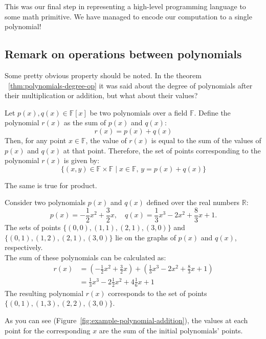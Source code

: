 \documentclass[../lecture-notes.tex]{subfiles}
\begin{document}
This was our final step in representing a high-level programming language to some math primitive.
We have managed to encode our computation to a single polynomial!

\subsection*{Remark on operations between polynomials}

\begin{remark}
    Some pretty obvious property should be noted. In the theorem ~\ref{thm:polynomials-degree-op}
    it was said about the degree of polynomials after their multiplication or addition, but what
    about their values?

    Let $p(x), q(x) \in \mathbb{F}[x]$ be two polynomials over a field $\mathbb{F}$. Define the 
    polynomial $r(x)$ as the sum of $p(x)$ and $q(x)$:
    \begin{equation*}
        r(x) = p(x) + q(x)
    \end{equation*}
    Then, for any point $x \in \mathbb{F}$, the value of $r(x)$ is equal to the sum of the
    values of $p(x)$ and $q(x)$ at that point. Therefore, the set of points corresponding to the 
    polynomial $r(x)$ is given by:
    \begin{equation*}
        \{(x, y) \in \mathbb{F} \times \mathbb{F} \mid x \in \mathbb{F}, \, y = p(x) + q(x) \}
    \end{equation*}

    The same is true for product.
\end{remark}

\begin{example}
    Consider two polynomials $p(x)$ and $q(x)$ defined over the real numbers $\mathbb{R}$:
    \begin{equation*}
        p(x) = -\frac{1}{2}x^2 + \frac{3}{2}x, \quad
        q(x) = \frac{1}{3}x^3 - 2x^2 + \frac{8}{3}x + 1.
    \end{equation*}
    The sets of points $\{(0, 0), (1, 1), (2, 1), (3, 0)\}$ and $\{(0, 1), (1, 2), (2, 1), (3, 0)\}$
    lie on the graphs of $p(x)$ and $q(x)$, respectively.\\
    
    The sum of these polynomials can be calculated as:
    \begin{align*}
        r(x) &= (-\frac{1}{2}x^2 + \frac{3}{2}x) + (\frac{1}{3}x^3 - 2x^2 + \frac{8}{3}x + 1) \\
             &= \frac{1}{3}x^3 - 2\frac{1}{2}x^2 + 4\frac{1}{6}x + 1
    \end{align*}
    The resulting polynomial $r(x)$ corresponds to the set of points $\{(0, 1), (1, 3), (2, 2), (3, 0)\}$.
    
    As you can see (Figure~\ref{fig:example-polynomial-addition}), the values at each point for the 
    corresponding $x$ are the sum of the initial polynomials' points.
\end{example}
\end{document}
